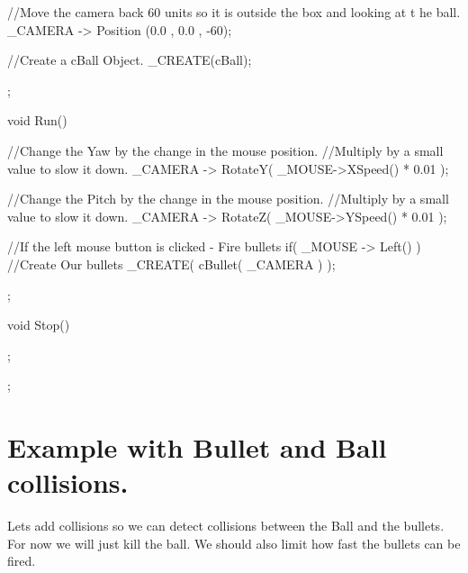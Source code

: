 \begin{DoxyCode}
{{        //Move the camera back 60 units so it is outside the box and looking at t
      he ball.
                _CAMERA -> Position (0.0 , 0.0 , -60);

        //Create a cBall Object.
                _CREATE(cBall);

        };

        void Run()
        {
                //Change the Yaw by the change in the mouse position.
                //Multiply by a small value to slow it down.
                        _CAMERA -> RotateY( _MOUSE->XSpeed() * 0.01 );

                //Change the Pitch by the change in the mouse position.
                //Multiply by a small value to slow it down.
                        _CAMERA -> RotateZ( _MOUSE->YSpeed() * 0.01 );

                //If the left mouse button is clicked - Fire bullets
                if( _MOUSE -> Left() )
                {
                        //Create Our bullets
                                _CREATE( cBullet( _CAMERA ) );
                }
        };

        void Stop()
        {

        };


 };
\end{DoxyCode}
 \hypertarget{_code_program_examples_CollisionsBouncingBallExample}{}\section{Example with Bullet and Ball collisions.}\label{_code_program_examples_CollisionsBouncingBallExample}
Lets add collisions so we can detect collisions between the Ball and the bullets. For now we will just kill the ball. We should also limit how fast the bullets can be fired. 
